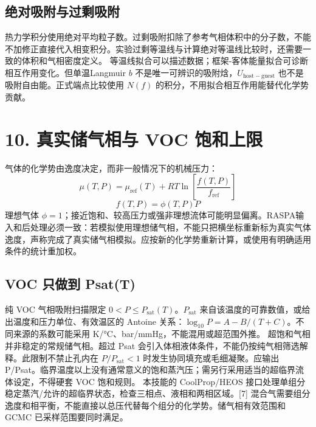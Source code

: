 \documentclass[UTF8,a4paper,11pt]{ctexart}
\begin{document}
\subsection*{绝对吸附与过剩吸附}
热力学积分使用绝对平均粒子数。过剩吸附扣除了参考气相体积中的分子数，不能不加修正直接代入相变积分。实验过剩等温线与计算绝对等温线比较时，还需要一致的体积和气相密度定义。
等温线拟合可以描述数据；框架-客体能量拟合可诊断相互作用变化。但单温Langmuir \(b\) 不是唯一可辨识的吸附焓，\(U_{\mathrm{host-guest}}\) 也不是吸附自由能。正式端点比较使用 \(N(f)\) 的积分，不用拟合相互作用能替代化学势贡献。
\clearpage
\section*{10. 真实储气相与 VOC 饱和上限}
气体的化学势由逸度决定，而非一般情况下的机械压力：
\begin{equation*}
\mu(T,P)=\mu_{\mathrm{ref}}(T)+RT\ln\left[\frac{f(T,P)}{f_{\mathrm{ref}}}\right]
\end{equation*}
\begin{equation*}
f(T,P)=\phi(T,P)P
\end{equation*}
理想气体 \(\phi=1\)；接近饱和、较高压力或强非理想流体可能明显偏离。RASPA输入和后处理必须一致：若模拟使用理想储气相，不能只把横坐标重新标为真实气体逸度，声称完成了真实储气相模拟。应按新的化学势重新计算，或使用有明确适用条件的统计重加权。
\subsection*{VOC 只做到 Psat(T)}
纯 VOC 气相吸附扫描限定 \(0<P\le P_{\mathrm{sat}}(T)\)。\(P_{\mathrm{sat}}\) 来自该温度的可靠数值，或给出温度和压力单位、有效温区的 Antoine 关系：\(\log_{10}P=A-B/(T+C)\)。不同来源的系数可能采用 K/°C、bar/mmHg，不能混用或超范围外推。
超饱和气相并非稳定的常规储气相。超过 Psat 会引入体相液体条件，不能仍按纯气相筛选解释。此限制不禁止孔内在 \(P/P_{\mathrm{sat}}<1\) 时发生协同填充或毛细凝聚。应输出 P/Psat。临界温度以上没有通常意义的饱和蒸汽压；需另行采用适当的超临界流体设定，不得硬套 VOC 饱和规则。
本技能的 CoolProp/HEOS 接口处理单组分稳定蒸汽/允许的超临界状态，检查三相点、液相和两相区域。[7] 混合气需要组分逸度和相平衡，不能直接以总压代替每个组分的化学势。储气相有效范围和 GCMC 已采样范围要同时满足。
\clearpage
\end{document}

